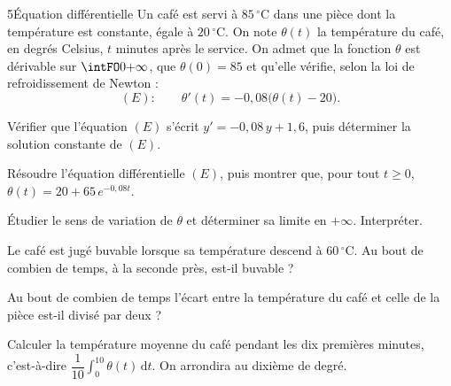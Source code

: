 \begin{exoBac}{5}{Équation différentielle}
Un café est servi à $85\,^\circ$C dans une pièce dont la température est constante, égale à $20\,^\circ$C. On note $\theta(t)$ la
température du café, en degrés Celsius, $t$ minutes après le service. On admet que la fonction $\theta$ est dérivable sur
$\intFO0{+\infty}$, que $\theta(0)=85$ et qu'elle vérifie, selon la loi de refroidissement de Newton :
\[(E):\qquad \theta'(t)=-0{,}08\big(\theta(t)-20\big).\]
\begin{questions}
  \item Vérifier que l'équation $(E)$ s'écrit $y'=-0{,}08\,y+1{,}6$, puis déterminer la solution constante de $(E)$.
  \item Résoudre l'équation différentielle $(E)$, puis montrer que, pour tout $t\geq0$, $\theta(t)=20+65\,e^{-0{,}08t}$.
  \item Étudier le sens de variation de $\theta$ et déterminer sa limite en $+\infty$. Interpréter.
  \item Le café est jugé buvable lorsque sa température descend à $60\,^\circ$C. Au bout de combien de temps, à la seconde près,
    est-il buvable ?
  \item Au bout de combien de temps l'écart entre la température du café et celle de la pièce est-il divisé par deux ?
  \item Calculer la température moyenne du café pendant les dix premières minutes, c'est-à-dire
    $\dfrac{1}{10}\displaystyle\int_0^{10}\theta(t)\,\mathrm{d}t$. On arrondira au dixième de degré.
\end{questions}
\end{exoBac}

